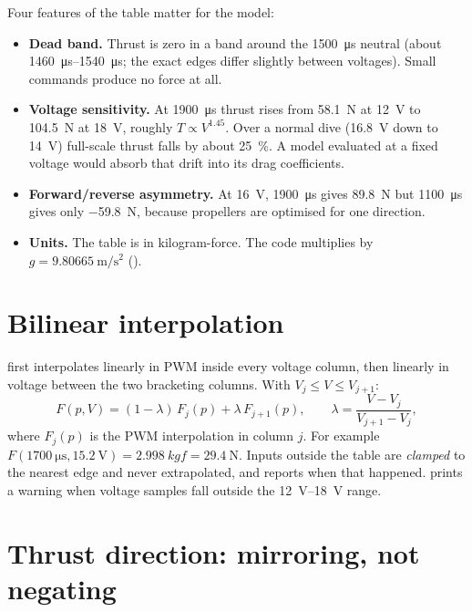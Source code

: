 Four features of the table matter for the model:
\begin{itemize}
  \item \textbf{Dead band.} Thrust is zero in a band around the \qty{1500}{\micro\second} neutral (about
        \qtyrange{1460}{1540}{\micro\second}; the exact edges differ slightly between voltages).
        Small commands produce no force at all.
  \item \textbf{Voltage sensitivity.} At \qty{1900}{\micro\second} thrust rises from
        \qty{58.1}{\newton} at \qty{12}{\volt} to \qty{104.5}{\newton} at \qty{18}{\volt}, roughly
        $T\propto V^{1.45}$. Over a normal dive (\qty{16.8}{\volt} down to \qty{14}{\volt})
        full-scale thrust falls by about \qty{25}{\percent}. A model evaluated at a fixed voltage
        would absorb that drift into its drag coefficients.
  \item \textbf{Forward/reverse asymmetry.} At \qty{16}{\volt}, \qty{1900}{\micro\second} gives
        \qty{89.8}{\newton} but \qty{1100}{\micro\second} gives only \qty{-59.8}{\newton}, because
        propellers are optimised for one direction.
  \item \textbf{Units.} The table is in kilogram-force. The code multiplies by
        $g = \qty{9.80665}{\meter\per\second\squared}$ ().
\end{itemize}

\section{Bilinear interpolation}

 first interpolates linearly in PWM inside every voltage
column, then linearly in voltage between the two bracketing columns. With $V_j \le V \le V_{j+1}$:
\begin{equation}
  F(p, V) = (1-\lambda)\,F_j(p) + \lambda\,F_{j+1}(p), \qquad
  \lambda = \frac{V - V_j}{V_{j+1} - V_j},
  \label{eq:bilinear}
\end{equation}
where $F_j(p)$ is the PWM interpolation in column $j$. For example
$F(\qty{1700}{\micro\second}, \qty{15.2}{\volt}) = \qty{2.998}{kgf} = \qty{29.4}{\newton}$.
Inputs outside the table are \emph{clamped} to the nearest edge and never extrapolated, and
 reports when that happened.  prints a warning when
voltage samples fall outside the \qtyrange{12}{18}{\volt} range.

\section{Thrust direction: mirroring, not negating}

